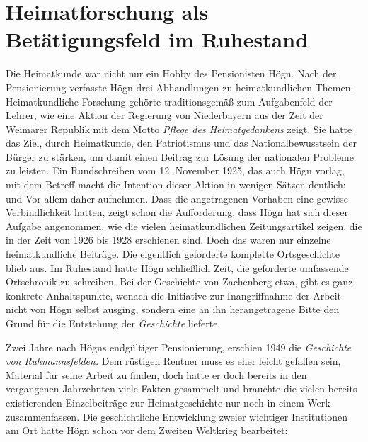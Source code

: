 \section{Heimatforschung als Betätigungsfeld im Ruhestand}

Die Heimatkunde war nicht nur ein Hobby des Pensionisten Högn. Nach der
Pensionierung verfasste Högn drei Abhandlungen zu heimatkundlichen
Themen. Heimatkundliche Forschung gehörte traditionsgemäß zum
Aufgabenfeld der Lehrer, wie eine Aktion der Regierung von Niederbayern
aus der Zeit der Weimarer Republik mit dem Motto \textit{Pflege des
Heimatgedankens} zeigt. Sie hatte das Ziel, durch Heimatkunde, den
Patriotismus und das Nationalbewusstsein der Bürger zu stärken, um
damit einen Beitrag zur Lösung der nationalen Probleme zu leisten.
Ein Rundschreiben vom 12. November 1925, das auch Högn vorlag, mit dem
Betreff  macht
die Intention dieser Aktion in wenigen Sätzen deutlich:
 und
 Vor
allem daher 
aufnehmen. Dass die angetragenen Vorhaben eine gewisse Verbindlichkeit
hatten, zeigt schon die Aufforderung, dass Högn hat sich dieser Aufgabe angenommen, wie die vielen
heimatkundlichen Zeitungsartikel zeigen, die in der Zeit von 1926 bis
1928 erschienen sind. Doch das waren nur einzelne heimatkundliche
Beiträge. Die eigentlich geforderte komplette Ortsgeschichte blieb
aus. Im Ruhestand hatte Högn schließlich Zeit, die geforderte
umfassende Ortschronik zu schreiben. Bei der Geschichte von
Zachenberg etwa, gibt es ganz konkrete Anhaltspunkte, wonach die
Initiative zur Inangriffnahme der Arbeit nicht von Högn selbst ausging,
sondern eine an ihn herangetragene Bitte den Grund für die Entstehung
der \textit{Geschichte} lieferte.

Zwei Jahre nach Högns endgültiger Pensionierung, erschien 1949 die
\textit{Geschichte von Ruhmannsfelden.} Dem rüstigen Rentner muss es
eher leicht gefallen sein, Material für seine Arbeit zu finden, doch
hatte er doch bereits in den vergangenen Jahrzehnten viele Fakten
gesammelt und brauchte die vielen bereits existierenden Einzelbeiträge
zur Heimatgeschichte nur noch in einem Werk zusammenfassen. Die
geschichtliche Entwicklung zweier wichtiger Institutionen am Ort
hatte Högn schon vor dem Zweiten Weltkrieg bearbeitet:

